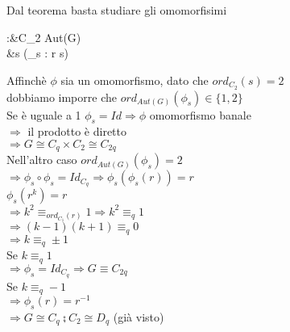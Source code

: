 \documentclass[12px]{article}
\begin{document}
	\begin{dimo}
		Dal teorema basta studiare gli omomorfisimi
		\begin{center}
		\begin{aligned}
			\phi:&C_2 \rightarrow Aut(G)\\
			     &s \rightarrow (\phi_s : r \rightarrow s)
			
		\end{aligned}
		\end{center}
		Affinchè $\phi$ sia un omomorfismo, dato che $ord_{C_2}(s) = 2$\\
		dobbiamo imporre che $ord_{Aut(G)}(\phi_s) \in \{1,2\}$\\
		Se è uguale a 1 $\phi_s = Id \Rightarrow \phi$ omomorfismo banale\\
		$ \Rightarrow $ il prodotto è diretto\\
		$ \Rightarrow G\cong C_q\times C_2\cong C_{2q}$ \\
		Nell'altro caso $ord_{Aut(G)}(\phi_s) = 2$\\
		$ \Rightarrow \phi_s\circ\phi_s = Id_{C_q} \Rightarrow \phi_s(\phi_s(r))=r$ \\
		$\phi_s(r^k) = r$\\
		$ \Rightarrow k^2\equiv_{ord_{C_1}(r)} 1 \Rightarrow k^2\equiv_q 1$ \\
		$ \Rightarrow (k-1)(k+1)\equiv_q 0$ \\
		$ \Rightarrow k\equiv_q \pm 1$ \\
		Se $k \equiv_q 1$\\
		$ \Rightarrow \phi_s = Id_{C_q} \Rightarrow G\equiv C_{2q}$ \\
		Se $k\equiv_q -1$\\
		$ \Rightarrow \phi_s(r) = r^{-1}$\\
		$ \Rightarrow G\cong C_q\semi C_2\cong D_q$ (già visto)

	\end{dimo}
	\newpage
\end{document}

